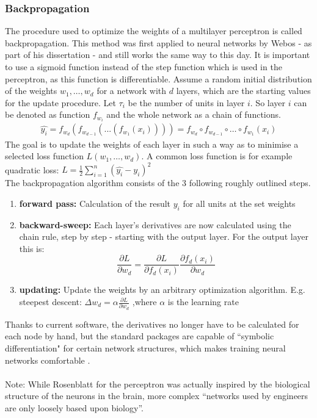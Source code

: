 \documentclass[11pt,a4paper]{article}
\begin{document}
\subsubsection{Backpropagation}
The procedure used to optimize the weights of a multilayer perceptron is called backpropagation. This method was first applied to neural networks by Webos - as part of his dissertation \cite{Werbos1974}- and still works the same way to this day. It is important to use a sigmoid function instead of the step function which is used in the perceptron, as this function is differentiable.  Assume a random initial distribution of the weights $w_1,\dots,w_d$ for a network with $d$ layers, which are the starting values for the update procedure. Let $\tau_i$ be the number of units in layer $i$. So layer $i$ can be denoted as function $f_{w_i}$ and the whole network as a chain of functions.
\begin{align}\label{network_chain}
	\hat{y_i}=f_{w_d}(f_{w_{d-1}}(...(f_{w_1}(x_i))))=f_{w_d}\circ f_{w_{d-1}} \circ \dots \circ f_{w_1}(x_i)
\end{align}
The goal is to update the weights of each layer in such a way as to minimise a selected loss function $L(w_1,\dots,w_d)$. A common loss function is for example quadratic loss: $L=\frac{1}{2}\sum_{i=1}^n(\hat{y_i}-y_i)^2$\\
The backpropagation algorithm consists of the 3 following roughly outlined steps.
\begin{enumerate}
	\item \textbf{forward pass:} Calculation of the result $y_i$ for all units at the set weights
	\item \textbf{backward-sweep:} Each layer's derivatives are now calculated using the chain rule, step by step - starting with the output layer. For the output layer this is:
	\[\frac{\partial L}{\partial w_d}=\frac{\partial L}{\partial f_d(x_i)}\frac{\partial f_d(x_i)}{\partial w_d}	\]
	\item \textbf{updating:} Update the weights by an arbitrary optimization algorithm. E.g. steepest descent:
	$\Delta w_d=\alpha \frac{\partial L}{\partial w_d}$
	,where $\alpha$ is the learning rate
\end{enumerate}
Thanks to current software, the derivatives no longer have to be calculated for each node by hand, but the standard packages are capable of ``symbolic differentiation" for certain network structures, which makes training neural networks comfortable \cite[p. 47]{Chollet2018}.\\
\ \\
Note: While Rosenblatt for the perceptron was actually inspired by the biological structure of the neurons in the brain, more complex “networks used by engineers are only loosely based upon biology”\cite{Hecht-Nielsen1988}.
\end{document}
